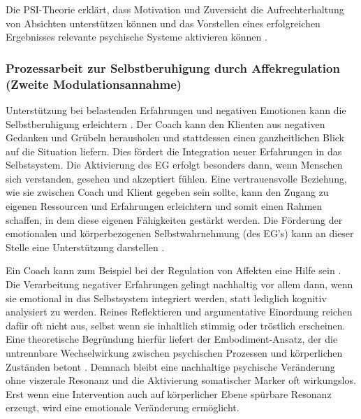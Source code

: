 Die PSI-Theorie erklärt, dass Motivation und Zuversicht die Aufrechterhaltung von Absichten unterstützen können und das Vorstellen eines erfolgreichen Ergebnisses relevante psychische Systeme aktivieren können \citep{kuhl2005neue,kuhl2014psi}.

\subsubsection{Prozessarbeit zur Selbstberuhigung durch Affekregulation (Zweite Modulationsannahme)}
Unterstützung bei belastenden Erfahrungen und negativen Emotionen kann die Selbstberuhigung erleichtern \citep{kuhl2005neue, kuhl2014psi}. Der Coach kann den Klienten aus negativen Gedanken und Grübeln herausholen und stattdessen einen ganzheitlichen Blick auf die Situation liefern. Dies fördert die Integration neuer Erfahrungen in das Selbstsystem. Die Aktivierung des EG erfolgt besonders dann, wenn Menschen sich verstanden, gesehen und akzeptiert fühlen. Eine vertrauensvolle Beziehung, wie sie zwischen Coach und Klient gegeben sein sollte, kann den Zugang zu eigenen Ressourcen und Erfahrungen erleichtern und somit einen Rahmen schaffen, in dem diese eigenen Fähigkeiten gestärkt werden. 
Die Förderung der emotionalen und körperbezogenen Selbstwahrnehmung (des EG's) kann an dieser Stelle eine Unterstützung darstellen \citep{storch2007ressourcenorientiertes}.

Ein Coach kann zum Beispiel bei der Regulation von Affekten eine Hilfe sein \citep{kuhl2014psi}. Die Verarbeitung negativer Erfahrungen gelingt nachhaltig vor allem dann, wenn sie emotional in das Selbstsystem integriert werden, statt lediglich kognitiv analysiert zu werden. Reines Reflektieren und argumentative Einordnung reichen dafür oft nicht aus, selbst wenn sie inhaltlich stimmig oder tröstlich erscheinen. Eine theoretische Begründung hierfür liefert der Embodiment-Ansatz, der die untrennbare Wechselwirkung zwischen psychischen Prozessen und körperlichen Zuständen betont \citep{tschacher2012bedeutung}. Demnach bleibt eine nachhaltige psychische Veränderung ohne viszerale Resonanz und die Aktivierung somatischer Marker oft wirkungslos. Erst wenn eine Intervention auch auf körperlicher Ebene spürbare Resonanz erzeugt, wird eine emotionale Veränderung ermöglicht.


